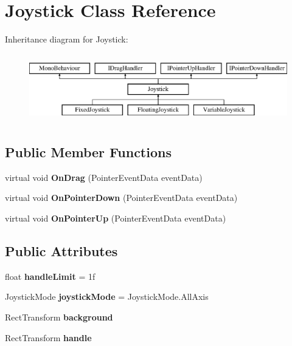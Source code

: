 \hypertarget{class_joystick}{}\section{Joystick Class Reference}
\label{class_joystick}
Inheritance diagram for Joystick\+:\begin{figure}[H]
\begin{center}
\leavevmode
\includegraphics[height=3.000000cm]{class_joystick}
\end{center}
\end{figure}
\subsection*{Public Member Functions}
\begin{DoxyCompactItemize}
\item 
\mbox{\label{class_joystick_a8effe0188579d5881908bd95d51b5859}} 
virtual void {\bfseries On\+Drag} (Pointer\+Event\+Data event\+Data)
\item 
\mbox{\label{class_joystick_a5e7b57028c248da4e06528c90cf37721}} 
virtual void {\bfseries On\+Pointer\+Down} (Pointer\+Event\+Data event\+Data)
\item 
\mbox{\label{class_joystick_ad56badf3ee242443cb4f5940d6b00701}} 
virtual void {\bfseries On\+Pointer\+Up} (Pointer\+Event\+Data event\+Data)
\end{DoxyCompactItemize}
\subsection*{Public Attributes}
\begin{DoxyCompactItemize}
\item 
\mbox{\label{class_joystick_aae5668c7a6a91fb382537b388da5ec40}} 
float {\bfseries handle\+Limit} = 1f
\item 
\mbox{\label{class_joystick_ada95319ba9975f743d6f074cbd0d7b83}} 
Joystick\+Mode {\bfseries joystick\+Mode} = Joystick\+Mode.\+All\+Axis
\item 
\mbox{\label{class_joystick_a893fe373ca256b507d68dee82d51b389}} 
Rect\+Transform {\bfseries background}
\item 
\mbox{\label{class_joystick_aca64551fcfa66b5a9558d80a64b426c8}} 
Rect\+Transform {\bfseries handle}
\end{DoxyCompactItemize}
